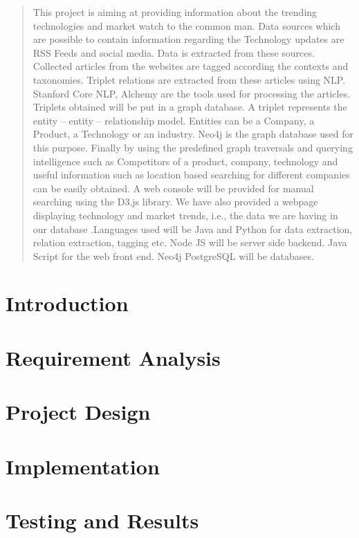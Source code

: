 \documentclass[12pt]{report}
\begin{document}
\begin{abstract}
This project is aiming at providing information about the trending technologies and market watch to the common man. Data sources which are possible to contain information regarding the Technology updates are RSS Feeds and social media. Data is extracted from these sources. Collected articles from the websites are tagged according the contexts and taxonomies. Triplet relations are extracted from these articles using NLP. Stanford Core NLP, Alchemy are the tools used for processing the articles. Triplets obtained will be put in a graph database. A triplet represents the entity – entity – relationship model. Entities can be a Company, a Product, a Technology or an industry. Neo4j is the graph database used for this purpose. Finally by using the predefined graph traversals and querying intelligence such as Competitors of a product, company, technology and useful information such as location based searching for different companies can be easily obtained. A web console will be provided for manual searching using the D3.js library. We have also provided a webpage displaying technology and market trends, i.e., the data we are having in our database .Languages used will be Java and Python for data extraction, relation extraction, tagging etc. Node JS will be server side backend. Java Script for the web front end. Neo4j  PostgreSQL will be databases.
\end{abstract}

\clearpage
{}
\tableofcontents		
\listoffigures

\chapter{Introduction}


\chapter{Requirement Analysis}


\chapter{Project Design}


\chapter{Implementation}


\chapter{Testing and Results}

\end{document}

